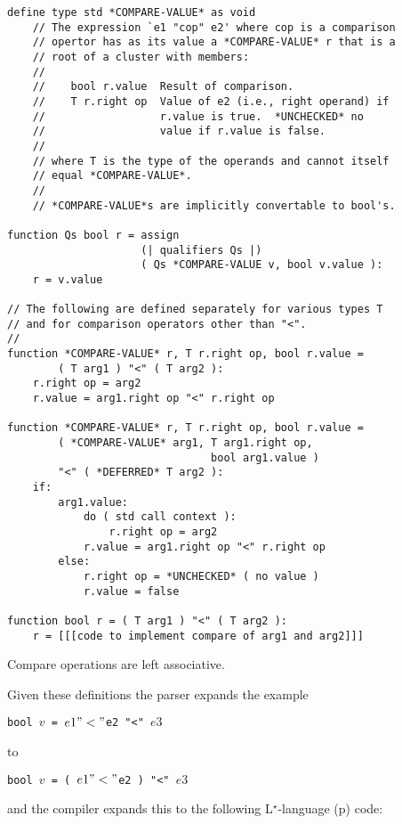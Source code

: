 \documentclass[12pt]{article}
\newcommand{\LSTAR}{L$^\star$}
\newcommand{\pagref}[1]{p\pageref{#1}}
\newenvironment{indpar}[1][0.3in]%
	{\begin{list}{}%
		     {\setlength{\itemsep}{0in}%
		      \setlength{\topsep}{0in}%
		      \setlength{\parsep}{1ex}%
		      \setlength{\labelwidth}{#1}%
		      \setlength{\leftmargin}{#1}%
		      \addtolength{\leftmargin}{\labelsep}}%
	 \item}%
	{\end{list}}
\begin{document}
\begin{indpar}\label{COMPARE-IMPLEMENTATION}\begin{verbatim}
define type std *COMPARE-VALUE* as void
    // The expression `e1 "cop" e2' where cop is a comparison
    // opertor has as its value a *COMPARE-VALUE* r that is a
    // root of a cluster with members:
    //
    //    bool r.value  Result of comparison.
    //    T r.right op  Value of e2 (i.e., right operand) if
    //                  r.value is true.  *UNCHECKED* no
    //                  value if r.value is false.
    //
    // where T is the type of the operands and cannot itself
    // equal *COMPARE-VALUE*.
    //
    // *COMPARE-VALUE*s are implicitly convertable to bool's.

function Qs bool r = assign
                     (| qualifiers Qs |)
                     ( Qs *COMPARE-VALUE v, bool v.value ):
    r = v.value

// The following are defined separately for various types T
// and for comparison operators other than "<".
// 
function *COMPARE-VALUE* r, T r.right op, bool r.value =
        ( T arg1 ) "<" ( T arg2 ):
    r.right op = arg2
    r.value = arg1.right op "<" r.right op

function *COMPARE-VALUE* r, T r.right op, bool r.value =
        ( *COMPARE-VALUE* arg1, T arg1.right op,
                                bool arg1.value )
        "<" ( *DEFERRED* T arg2 ):
    if:
        arg1.value:
            do ( std call context ):
                r.right op = arg2
            r.value = arg1.right op "<" r.right op
        else:
            r.right op = *UNCHECKED* ( no value )
            r.value = false

function bool r = ( T arg1 ) "<" ( T arg2 ):
    r = [[[code to implement compare of arg1 and arg2]]]
\end{verbatim}\end{indpar}

Compare operations are left associative.

Given these definitions the parser expands the example
\begin{center}\label{COMPARE-EXAMPLE}
\tt bool $v$ = $e1 "<" $e2 "<" $e3$
\end{center}
to
\begin{center}
\tt bool $v$ = ( $e1 "<" $e2 ) "<" $e3$
\end{center}
and the compiler expands this to the following
\LSTAR-language (\pagref{LSTAR-LANGUAGE}) code:
\end{document}
